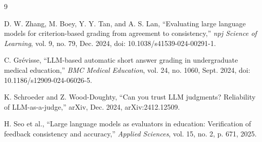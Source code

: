\documentclass[11pt]{article}
\begin{document}
\begin{thebibliography}{9}

D. W. Zhang, M. Boey, Y. Y. Tan, and A. S. Lan, ``Evaluating large language models for criterion-based grading from agreement to consistency,'' \textit{npj Science of Learning}, vol. 9, no. 79, Dec. 2024, doi: 10.1038/s41539-024-00291-1.

C. Grévisse, ``LLM-based automatic short answer grading in undergraduate medical education,'' \textit{BMC Medical Education}, vol. 24, no. 1060, Sept. 2024, doi: 10.1186/s12909-024-06026-5.

K. Schroeder and Z. Wood-Doughty, ``Can you trust LLM judgments? Reliability of LLM-as-a-judge,'' arXiv, Dec. 2024, arXiv:2412.12509.

H. Seo et al., ``Large language models as evaluators in education: Verification of feedback consistency and accuracy,'' \textit{Applied Sciences}, vol. 15, no. 2, p. 671, 2025.

\end{thebibliography}
\end{document}
